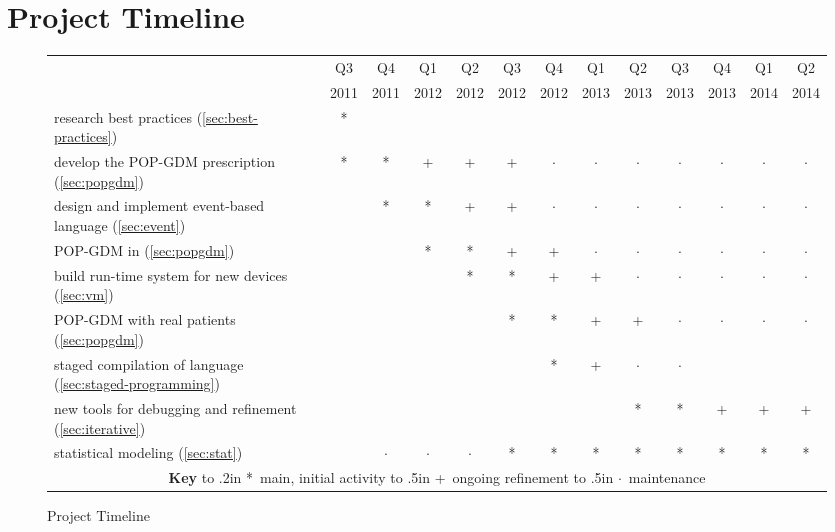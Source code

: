 
\section{Project Timeline}

\begin{figure}
\newcommand{\MA}{*} %
\newcommand{\RF}{+} %
\newcommand{\MT}{\ensuremath{\cdot}} %

\begin{center}
\begin{scriptsize}
\begin{tabular}{|p{1.3in}|c|c|c|c|c|c|c|c|c|c|c|c|} \hline
 & Q3   & Q4   & Q1   & Q2   & Q3   & Q4   & Q1   & Q2   & Q3   & Q4   & Q1   & Q2   \\
 & 2011 & 2011 & 2012 & 2012 & 2012 & 2012 & 2013 & 2013 & 2013 & 2013 & 2014 & 2014 \\ \hline
\raggedright{}research best practices (\ref{sec:best-practices})
 & \MA  &      &      &      &      &      &      &      &      &      &      &      \\ \hline
\raggedright{}develop the POP-GDM prescription (\ref{sec:popgdm}) 
 & \MA  & \MA  & \RF  &  \RF & \RF  & \MT  & \MT  & \MT  & \MT  & \MT  & \MT  & \MT  \\ \hline
\raggedright{}design and implement event-based language (\ref{sec:event})
 &      & \MA  & \MA  & \RF  & \RF  & \MT  & \MT  & \MT  & \MT  & \MT  & \MT  & \MT  \\ \hline
\raggedright{}POP-GDM in \poppl{} (\ref{sec:popgdm})
 &      &      & \MA  & \MA  & \RF  & \RF  & \MT  & \MT  & \MT  & \MT  & \MT  & \MT  \\ \hline
\raggedright{}build run-time system for new devices (\ref{sec:vm})
 &      &      &      & \MA  & \MA  & \RF  & \RF  & \MT  & \MT  & \MT  & \MT  & \MT  \\ \hline
\raggedright{}POP-GDM with real patients (\ref{sec:popgdm})
 &      &       &      &      & \MA  & \MA  & \RF  & \RF  & \MT  & \MT  & \MT  & \MT \\ \hline
\raggedright{}staged compilation of language (\ref{sec:staged-programming})
 &      &      &      &      &      & \MA  & \RF  & \MT  & \MT  &      &      &      \\ \hline
\raggedright{}new tools for debugging and refinement (\ref{sec:iterative})
 &      &      &      &      &      &      &      & \MA  & \MA  & \RF  & \RF  & \RF  \\ \hline
\raggedright{}statistical modeling (\ref{sec:stat})
 &      &  \MT & \MT  & \MT &  \MA & \MA   & \MA  & \MA  & \MA  & \MA  & \MA  & \MA  \\ \hline
\multicolumn{13}{c}{\textbf{Key} \hbox to .2in{} \MA~main, initial activity \hbox to .5in{} \RF~ongoing refinement  \hbox to .5in{} \MT~maintenance}
\end{tabular}
\end{scriptsize}
\end{center}
\vspace*{-10pt}
\caption{Project Timeline}\label{fig:timeline}
\vspace*{-10pt}
\end{figure}

